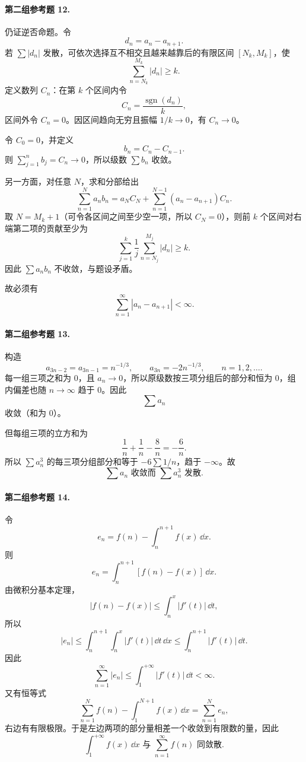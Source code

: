 \paragraph{第二组参考题 12.}
\begin{xsolution}
仍证逆否命题。令
\[
 d_n=a_n-a_{n+1}.
\]
若 $\sum|d_n|$ 发散，可依次选择互不相交且越来越靠后的有限区间 $[N_k,M_k]$，使
\[
 \sum_{n=N_k}^{M_k}|d_n|\geq k.
\]
定义数列 $C_n$：在第 $k$ 个区间内令
\[
 C_n=\frac{\operatorname{sgn}(d_n)}{k},
\]
区间外令 $C_n=0$。因区间趋向无穷且振幅 $1/k\to0$，有 $C_n\to0$。

令 $C_0=0$，并定义
\[
 b_n=C_n-C_{n-1}.
\]
则 $\sum_{j=1}^{n}b_j=C_n\to0$，所以级数 $\sum b_n$ 收敛。

另一方面，对任意 $N$，求和分部给出
\[
 \sum_{n=1}^{N}a_nb_n
 =a_NC_N+\sum_{n=1}^{N-1}(a_n-a_{n+1})C_n.
\]
取 $N=M_k+1$（可令各区间之间至少空一项，所以 $C_N=0$），则前 $k$ 个区间对右端第二项的贡献至少为
\[
 \sum_{j=1}^{k}\frac1j\sum_{n=N_j}^{M_j}|d_n|\geq k.
\]
因此 $\sum a_nb_n$ 不收敛，与题设矛盾。

故必须有
\[
 \boxed{\sum_{n=1}^{\infty}|a_n-a_{n+1}|<\infty}.
\]
\end{xsolution}

\paragraph{第二组参考题 13.}
\begin{xsolution}
构造
\[
 a_{3n-2}=a_{3n-1}=n^{-1/3},
 \qquad
 a_{3n}=-2n^{-1/3},
 \qquad n=1,2,\ldots.
\]
每一组三项之和为 $0$，且 $a_n\to0$，所以原级数按三项分组后的部分和恒为 $0$，组内偏差也随 $n\to\infty$ 趋于 $0$。因此
\[
 \sum a_n
\]
收敛（和为 $0$）。

但每组三项的立方和为
\[
 \frac1n+\frac1n-\frac8n=-\frac6n.
\]
所以 $\sum a_n^3$ 的每三项分组部分和等于 $-6\sum1/n$，趋于 $-\infty$。故
\[
 \boxed{\sum a_n\text{ 收敛而 }\sum a_n^3\text{ 发散}.}
\]
\end{xsolution}

\paragraph{第二组参考题 14.}
\begin{xsolution}
令
\[
 e_n=f(n)-\int_n^{n+1}f(x)\,\dd x.
\]
则
\[
 e_n=\int_n^{n+1}[f(n)-f(x)]\,\dd x.
\]
由微积分基本定理，
\[
 |f(n)-f(x)|
 \leq\int_n^x|f'(t)|\,\dd t,
\]
所以
\[
 |e_n|
 \leq\int_n^{n+1}\int_n^x|f'(t)|\,\dd t\,\dd x
 \leq\int_n^{n+1}|f'(t)|\,\dd t.
\]
因此
\[
 \sum_{n=1}^{\infty}|e_n|
 \leq\int_1^{+\infty}|f'(t)|\,\dd t<\infty.
\]
又有恒等式
\[
 \sum_{n=1}^{N}f(n)-\int_1^{N+1}f(x)\,\dd x
 =\sum_{n=1}^{N}e_n,
\]
右边有有限极限。于是左边两项的部分量相差一个收敛到有限数的量，因此
\[
 \boxed{\int_1^{+\infty}f(x)\,\dd x\text{ 与 }\sum_{n=1}^{\infty}f(n)\text{ 同敛散}.}
\]
\end{xsolution}

